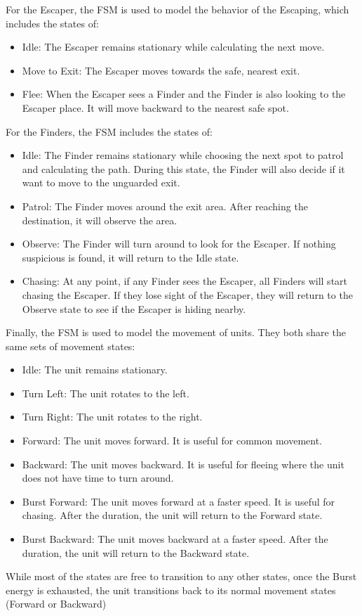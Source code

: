 \documentclass[a4paper,12pt]{article}
\begin{document}
For the Escaper, the FSM is used to model the behavior of the Escaping, which includes the states of:
\begin{itemize}
    \item Idle: The Escaper remains stationary while calculating the next move.
    \item Move to Exit: The Escaper moves towards the safe, nearest exit.
    \item Flee: When the Escaper sees a Finder and the Finder is also looking to the Escaper place.
        It will move backward to the nearest safe spot.
\end{itemize}

For the Finders, the FSM includes the states of:
\begin{itemize}
    \item Idle: The Finder remains stationary while choosing the next spot to patrol and calculating the path.
        During this state, the Finder will also decide if it want to move to the unguarded exit.
    \item Patrol: The Finder moves around the exit area.
        After reaching the destination, it will observe the area.
    \item Observe: The Finder will turn around to look for the Escaper.
        If nothing suspicious is found, it will return to the Idle state.
    \item Chasing: At any point, if any Finder sees the Escaper, all Finders will start chasing the Escaper.
        If they lose sight of the Escaper, they will return to the Observe state to see if the Escaper is hiding nearby.
\end{itemize}

Finally, the FSM is used to model the movement of units.
They both share the same sets of movement states:
\begin{itemize}
    \item Idle: The unit remains stationary.
    \item Turn Left: The unit rotates to the left.
    \item Turn Right: The unit rotates to the right.
    \item Forward: The unit moves forward. It is useful for common movement.
    \item Backward: The unit moves backward. It is useful for fleeing where the unit does not have time to turn around.
    \item Burst Forward: The unit moves forward at a faster speed. It is useful for chasing. After the duration, the unit will return to the Forward state.
    \item Burst Backward: The unit moves backward at a faster speed. After the duration, the unit will return to the Backward state.
\end{itemize}
While most of the states are free to transition to any other states, once the Burst energy is exhausted, the unit transitions back to its normal movement states (Forward or Backward)
\end{document}
